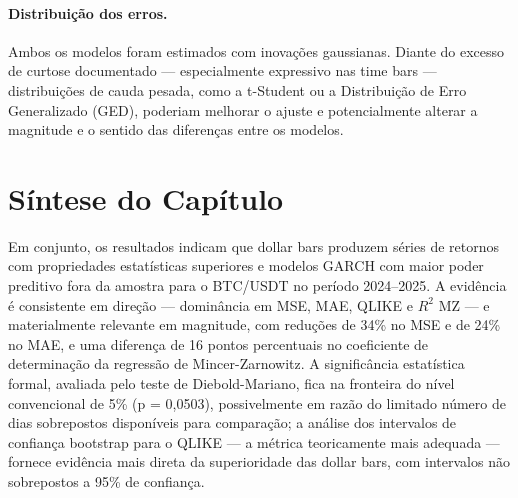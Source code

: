 \paragraph{Distribuição dos erros.}
Ambos os modelos foram estimados com inovações gaussianas. Diante do excesso de curtose
documentado — especialmente expressivo nas time bars — distribuições de cauda pesada,
como a t-Student ou a Distribuição de Erro Generalizado (GED), poderiam melhorar o ajuste
e potencialmente alterar a magnitude e o sentido das diferenças entre os modelos.

\section{Síntese do Capítulo}
\label{sec:sintese_cap4}

Em conjunto, os resultados indicam que dollar bars produzem séries de retornos com
propriedades estatísticas superiores e modelos GARCH com maior poder preditivo fora
da amostra para o BTC/USDT no período 2024–2025. A evidência é consistente em direção
— dominância em MSE, MAE, QLIKE e $R^2$ MZ — e materialmente relevante em magnitude,
com reduções de 34\% no MSE e de 24\% no MAE, e uma diferença de 16 pontos percentuais
no coeficiente de determinação da regressão de Mincer-Zarnowitz. A significância estatística
formal, avaliada pelo teste de Diebold-Mariano, fica na fronteira do nível convencional
de 5\% (p = 0,0503), possivelmente em razão do limitado número de dias sobrepostos
disponíveis para comparação; a análise dos intervalos de confiança bootstrap para o QLIKE
— a métrica teoricamente mais adequada — fornece evidência mais direta da superioridade
das dollar bars, com intervalos não sobrepostos a 95\% de confiança.
